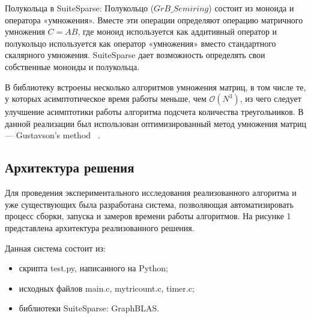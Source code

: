 \documentclass[14pt]{matmex-diploma}
\begin{document}
Полукольца в SuiteSparse: Полукольцо ($GrB\_Semiring$) состоит из
моноида и оператора «умножения». Вместе эти операции
определяют операцию матричного умножения  $C = AB$, где
моноид используется как аддитивный оператор и полукольцо используется как оператор «умножения» вместо стандартного скалярного умножения. SuiteSparse дает возможность определять свои собственные моноиды и полукольца.

В библиотеку встроены несколько алгоритмов умножения матриц, в том числе те, у которых асимптотическое время работы меньше, чем $\mathcal{O}(N^3)$, из чего следует улучшение асимптотики работы алгоритма подсчета количества треугольников. В данной реализации был использован оптимизированный метод умножения матриц --- Gustavson's method ~\cite{Gustavson}.

\subsection{Архитектура решения}
Для проведения экспериментального исследования реализованного алгоритма и уже существующих была разработана система, позволяющая автоматизировать процесс сборки, запуска и замеров времени работы алгоритмов. На рисунке 1 представлена архитектура реализованного решения.

Данная система состоит из:
\begin{itemize}
\item скрипта test.py, написанного на Python;
\item исходных файлов main.c, mytricount.c, timer.c;
\item библиотеки SuiteSparse: GraphBLAS.
\end{itemize}
\end{document}
